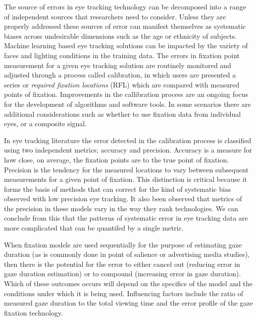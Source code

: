 \documentclass[sigconf]{acmart}
\numberwithin{equation}{section}
\begin{document}
The source of errors in eye tracking technology can be decomposed into a range of
independent sources that researchers need to consider\cite{Holmqvist2012}.
Unless they are properly addressed these sources of error can manifest themselves
as systematic biases across undesirable dimensions such as the age\cite{Dalrymple2018}
or ethnicity of subjects\cite{Blignaut2013}. Machine learning based eye tracking solutions
can be impacted by the variety of faces and lighting conditions in the training data. 
The errors in fixation point measurement for a given eye tracking solution are routinely
monitored and adjusted through a process called calibration, in which users are presented
a series or \emph{required fixation locations} (RFL) which are compared with measured 
points of fixation\cite{Hornof2002}. 
Improvements in the callibration process
are an ongoing focus for the development of algorithms\cite{Zhang2014,Hassoumi2019} 
and software tools\cite{ETCAL2018}. In some scenarios there are additional considerations
such as whether to use fixation data from individual eyes, or a composite 
signal\cite{Hooge2019}.

In eye tracking literature the error detected in the calibration process is classified
using two independent metrics; accuracy and precision. Accuracy is a measure for how
close, on average, the fixation points are to the true point of fixation.
Precision is the tendency for the measured locations to vary between subsequent measurements
for a given point of fixation\cite{Holmqvist2022}. This distinction
is critical because it forms the basis of methods that can correct for the kind of 
systematic bias observed with low precision eye tracking. It also been observed that
metrics of the precision in these models vary in the way they rank 
technologies\cite{Niehorster2020}. We can conclude from this that the patterns of 
systematic error in eye tracking
data are more complicated that can be quantifed by a single metric.

When fixation models are used sequentially for the purpose of estimating gaze duration
(as is commonly done in point of salience or advertising media studies), 
then there is the potential for the error
to either cancel out (reducing error in gaze duration estimation) or to compound
(increasing error in gaze duration). Which of these outcomes occurs will depend on the
specifics of the model and the conditions under which it is being used.
Influencing factors include the ratio of measured gaze duration to the 
total viewing time and the error profile of the gaze fixation technology.
\end{document}
